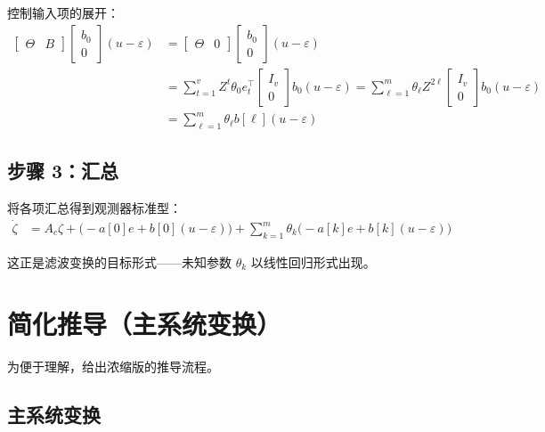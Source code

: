 \documentclass[12pt,a4paper]{article}
\begin{document}
控制输入项的展开：
\begin{align*}
\left[\begin{array}{c|c} \Theta & B \end{array}\right]
\begin{bmatrix} b_0 \\ 0 \end{bmatrix} (u-\varepsilon)
&= \left[\begin{array}{c|c} \Theta & 0 \end{array}\right]
\begin{bmatrix} b_0 \\ 0 \end{bmatrix} (u-\varepsilon) \\
&= \sum_{t=1}^{v} Z^{t}\theta_0 e_t^\top
\begin{bmatrix} I_v \\ 0 \end{bmatrix}
b_0 (u-\varepsilon)
= \sum_{\ell=1}^{m} \theta_{\ell} Z^{2\ell}
\begin{bmatrix} I_v \\ 0 \end{bmatrix}
b_0 (u-\varepsilon) \\
&= \sum_{\ell=1}^{m} \theta_{\ell} b[\ell] (u-\varepsilon)
\end{align*}

\subsection{步骤 3：汇总}

将各项汇总得到观测器标准型：
\begin{align}
\dot{\zeta} &= A_c \zeta + \bigl(-a[0]e + b[0](u-\varepsilon)\bigr)
+ \sum_{k=1}^{m} \theta_{k} \bigl(-a[k]e + b[k](u-\varepsilon)\bigr)
\label{eq:observer_canonical}
\end{align}

这正是滤波变换的目标形式——未知参数 $\theta_k$ 以线性回归形式出现。

\section{简化推导（主系统变换）}

为便于理解，给出浓缩版的推导流程。

\subsection{主系统变换}
\end{document}
